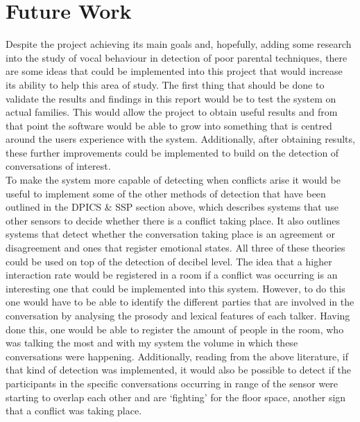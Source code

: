 \documentclass[a4paper,11pt]{report}
\begin{document}
\section{Future Work}
Despite the project achieving its main goals and, hopefully, adding some research into the study of vocal behaviour in detection of poor parental techniques, there are some ideas that could be implemented into this project that would increase its ability to help this area of study. The first thing that should be done to validate the results and findings in this report would be to test the system on actual families. This would allow the project to obtain useful results and from that point the software would be able to grow into something that is centred around the users experience with the system. Additionally, after obtaining results, these further improvements could be implemented to build on the detection of conversations of interest.\\

To make the system more capable of detecting when conflicts arise it would be useful to implement some of the other methods of detection that have been outlined in the DPICS \& SSP section above, which describes systems that use other sensors to decide whether there is a conflict taking place. It also outlines systems that detect whether the conversation taking place is an agreement or disagreement and ones that register emotional states. All three of these theories could be used on top of the detection of decibel level. The idea that a higher interaction rate would be registered in a room if a conflict was occurring is an interesting one that could be implemented into this system. However, to do this one would have to be able to identify the different parties that are involved in the conversation by analysing the prosody and lexical features of each talker. Having done this, one would be able to register the amount of people in the room, who was talking the most and with my system the volume in which these conversations were happening. Additionally, reading from the above literature, if that kind of detection was implemented, it would also be possible to detect if the participants in the specific conversations occurring in range of the sensor were starting to overlap each other and are ‘fighting’ for the floor space, another sign that a conflict was taking place.\\
\end{document}

